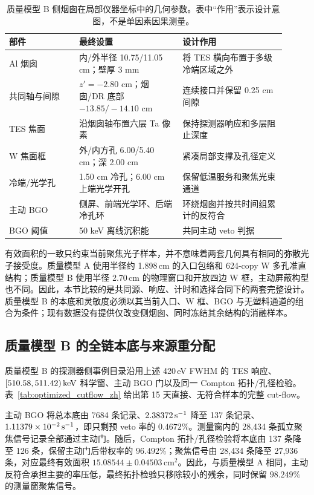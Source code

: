 \begin{table}[!ht]
\centering
\caption{质量模型 B 侧烟囱在局部仪器坐标中的几何参数。表中“作用”表示设计意图，不是单因素因果测量。}
\label{tab:final_geometry_zh}
\footnotesize
\begin{tabular}{p{0.23\linewidth}p{0.34\linewidth}p{0.34\linewidth}}
\toprule
部件 & 最终设置 & 设计作用 \\
\midrule
Al 烟囱 & 内/外半径 10.75/11.05 cm；壁厚 3 mm & 将 TES 横向布置于多级冷端区域之外 \\
共同轴与间隙 & $z'=-2.80$ cm；烟囱/DR 底部 $-13.85/-14.10$ cm & 连续接口并保留 0.25 cm 间隙 \\
TES 焦面 & 沿烟囱轴布置六层 Ta 像素 & 保持探测器响应和多层阻止深度 \\
W 焦面框 & 外/内方孔 6.00/5.40 cm；深 2.00 cm & 紧凑局部支撑及孔径定义 \\
冷端/光学孔 & 1.50 cm 冷孔；6.00 cm 上端光学开孔 & 保留低温服务和聚焦光束通道 \\
主动 BGO & 侧屏、前端光学环、后端冷孔环 & 环绕烟囱并按共时间组累计的反符合 \\
BGO 阈值 & 50 keV 离线沉积能 & 共同主动 veto 判据 \\
\bottomrule
\end{tabular}
\end{table}

有效面积的一致只约束当前聚焦光子样本，并不意味着两套几何具有相同的弥散光子接受度。质量模型 A 使用半径约 1.898\,cm 的入口包络和 624-copy W 多孔准直结构；质量模型 B 使用半径 2.70\,cm 的物理窗口和开放四边 W 框，主动屏蔽构型也不同。因此，本节比较的是共同源、响应、计时和选择合同下的两套完整设计。质量模型 B 的本底和灵敏度必须以其当前入口、W 框、BGO 与无塑料通道的组合为条件；现有数据没有提供仅改变侧烟囱、同时冻结其余结构的消融样本。

\FloatBarrier

\subsection{质量模型 B 的全链本底与来源重分配}
\label{subsec:optimized_fullchain_zh}

质量模型 B 的探测器侧事例目录沿用上述 420\,eV FWHM 的 TES 响应、$[510.58,511.42)\,\mathrm{keV}$ 科学窗、主动 BGO 门以及同一 Compton 拓扑/孔径检验。表~\ref{tab:optimized_cutflow_zh} 给出第 15 天直接、无符合样本的完整 cut-flow。

主动 BGO 将总本底由 7684 条记录、$2.38372\,\mathrm{s^{-1}}$ 降至 137 条记录、$1.11379\times10^{-2}\,\mathrm{s^{-1}}$，即只剩预 veto 率的 $0.4672\%$。测量窗内的 28,434 条孤立聚焦信号记录全部通过主动门。随后，Compton 拓扑/孔径检验将本底由 137 条降至 126 条，保留主动门后带权率的 $96.492\%$；聚焦信号由 28,434 条降至 27,936 条，对应最终有效面积 $15.08544\pm0.04503\,\mathrm{cm^2}$。因此，与质量模型 A 相同，主动反符合承担主要的率压低，最终拓扑检验只移除较小的残余，同时保留 $98.249\%$ 的测量窗聚焦信号。

